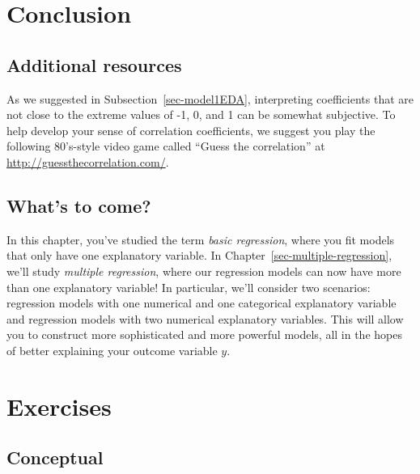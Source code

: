 \documentclass[
  letterpaper,
  DIV=11,
  numbers=noendperiod]{scrreprt}
\theoremstyle{definition}
\theoremstyle{remark}
\begin{document}
\hypertarget{sec-basic-reg-conclusion}{%
\section{Conclusion}\label{sec-basic-reg-conclusion}}

\hypertarget{sec-additional-resources-basic-regression}{%
\subsection{Additional
resources}\label{sec-additional-resources-basic-regression}}

As we suggested in Subsection~\ref{sec-model1EDA}, interpreting
coefficients that are not close to the extreme values of -1, 0, and 1
can be somewhat subjective. To help develop your sense of correlation
coefficients, we suggest you play the following 80's-style video game
called ``Guess the correlation'' at
\url{http://guessthecorrelation.com/}.

\hypertarget{whats-to-come-2}{%
\subsection{What's to come?}\label{whats-to-come-2}}

In this chapter, you've studied the term \emph{basic regression}, where
you fit models that only have one explanatory variable. In
Chapter~\ref{sec-multiple-regression}, we'll study \emph{multiple
regression}, where our regression models can now have more than one
explanatory variable! In particular, we'll consider two scenarios:
regression models with one numerical and one categorical explanatory
variable and regression models with two numerical explanatory variables.
This will allow you to construct more sophisticated and more powerful
models, all in the hopes of better explaining your outcome variable
\(y\).

\hypertarget{sec-ex05}{%
\section{Exercises}\label{sec-ex05}}

\hypertarget{sec-ex05-conceptual}{%
\subsection{Conceptual}\label{sec-ex05-conceptual}}
\end{document}

